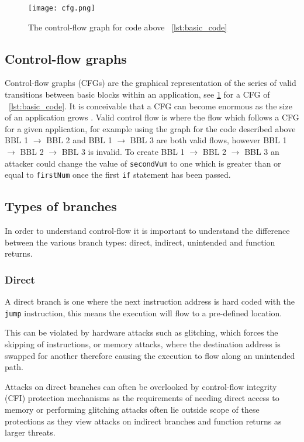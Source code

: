\begin{figure}
  \texttt{[image: cfg.png]}
  \caption{The control-flow graph for code above ~\ref{lst:basic_code}}
  \label{fig:basicCFG}
\end{figure}

\subsection{Control-flow graphs}
Control-flow graphs (CFGs) are the graphical representation of the series of valid transitions between basic blocks within an application, see \ref{fig:basicCFG} for a CFG of ~\ref{lst:basic_code}. It is conceivable that a CFG can become enormous as the size of an application grows . Valid control flow is where the flow which follows a CFG for a given application, for example using the graph for the code described above BBL 1 $\rightarrow$ BBL 2 and BBL 1 $\rightarrow$ BBL 3 are both valid flows, however BBL 1 $\rightarrow$ BBL 2 $\rightarrow$ BBL 3 is invalid. To create BBL 1 $\rightarrow$ BBL 2 $\rightarrow$ BBL 3 an attacker could change the value of \verb|secondVum| to one which is greater than or equal to \verb|firstNum| once the first \verb|if| statement has been passed. 

\subsection{Types of branches}
In order to understand control-flow it is important to understand the difference between the various branch types: direct, indirect, unintended and function returns.

\subsubsection{Direct}
A direct branch is one where the next instruction address is hard coded with the \verb|jump| instruction, this means the execution will flow to a pre-defined location.

This can be violated by hardware attacks such as glitching, which forces the skipping of instructions, or memory attacks, where the destination address is swapped for another therefore causing the execution to flow along an unintended path.

Attacks on direct branches can often be overlooked by control-flow integrity (CFI) protection mechanisms as the requirements of needing direct access to memory or performing glitching attacks often lie outside scope of these protections as they view attacks on indirect branches and function returns as larger threats.

